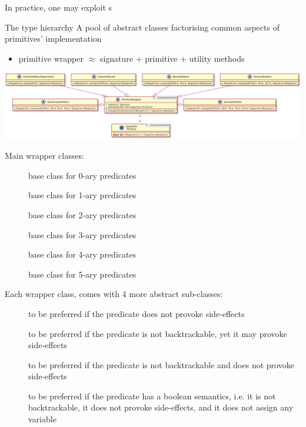 \documentclass[presentation]{beamer}\mode<presentation>{\usetheme{AMSBolognaFC}}
\begin{document}
\begin{frame}[allowframebreaks]{In practice, one may exploit s}
    \begin{block}{The  type hierarchy}
        A pool of abstract classes factorising common aspects of primitives' implementation
        \begin{itemize}
            \item primitive wrapper $\approx$ signature + primitive + utility methods
        \end{itemize}
    \end{block}

    \framebreak

    \begin{center}
        \includegraphics[width=\linewidth]{figures/wrappers.pdf}
    \end{center}

    \framebreak

    Main wrapper classes:
    \begin{description}
        \item[] base class for 0-ary predicates
        \item[] base class for 1-ary predicates
        \item[] base class for 2-ary predicates
        \item[] base class for 3-ary predicates
        \item[] base class for 4-ary predicates
        \item[] base class for 5-ary predicates
    \end{description}

    \framebreak

    Each wrapper class, comes with 4 more abstract sub-classes:
    \begin{description}
        \item[] to be preferred if the predicate does not provoke side-effects
        \item[] to be preferred if the predicate is not backtrackable, yet it may provoke side-effects
        \item[] to be preferred if the predicate is not backtrackable and does not provoke side-effects
        \item[] to be preferred if the predicate has a boolean semantics, i.e. it is not backtrackable, it does not provoke side-effects, and it does not assign any variable
    \end{description}
\end{frame}
\end{document}
